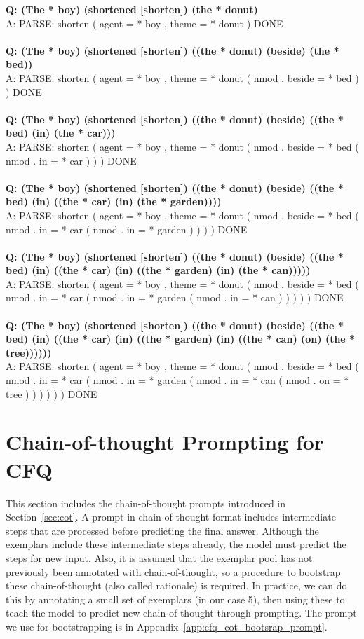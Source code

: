 \documentclass{article} \usepackage{iclr2022_conference,times}
\newcommand{\prompt}[1]{{\footnotesize \textsf{#1}}}
\begin{document}
\prompt{\textbf{Q: (The * boy) (shortened [shorten]) (the * donut)} \\
A: PARSE: shorten ( agent = * boy , theme = * donut ) DONE \\
\\
\textbf{Q: (The * boy) (shortened [shorten]) ((the * donut) (beside) (the * bed))} \\
A: PARSE: shorten ( agent = * boy , theme = * donut ( nmod . beside = * bed ) ) DONE \\
\\
\textbf{Q: (The * boy) (shortened [shorten]) ((the * donut) (beside) ((the * bed) (in) (the * car)))} \\
A: PARSE: shorten ( agent = * boy , theme = * donut ( nmod . beside = * bed ( nmod . in = * car ) ) ) DONE \\
\\
\textbf{Q: (The * boy) (shortened [shorten]) ((the * donut) (beside) ((the * bed) (in) ((the * car) (in) (the * garden))))} \\
A: PARSE: shorten ( agent = * boy , theme = * donut ( nmod . beside = * bed ( nmod . in = * car ( nmod . in = * garden ) ) ) ) DONE \\
\\
\textbf{Q: (The * boy) (shortened [shorten]) ((the * donut) (beside) ((the * bed) (in) ((the * car) (in) ((the * garden) (in) (the * can)))))} \\
A: PARSE: shorten ( agent = * boy , theme = * donut ( nmod . beside = * bed ( nmod . in = * car ( nmod . in = * garden ( nmod . in = * can ) ) ) ) ) DONE \\
\\
\textbf{Q: (The * boy) (shortened [shorten]) ((the * donut) (beside) ((the * bed) (in) ((the * car) (in) ((the * garden) (in) ((the * can) (on) (the * tree))))))} \\
A: PARSE: shorten ( agent = * boy , theme = * donut ( nmod . beside = * bed ( nmod . in = * car ( nmod . in = * garden ( nmod . in = * can ( nmod . on = * tree ) ) ) ) ) ) DONE
}


\section{Chain-of-thought Prompting for CFQ}

This section includes the chain-of-thought prompts introduced in Section~\ref{sec:cot}. A prompt in chain-of-thought format includes intermediate steps that are processed before predicting the final answer. Although the exemplars include these intermediate steps already, the model must predict the steps for new input. Also, it is assumed that the exemplar pool has not previously been annotated with chain-of-thought, so a procedure to bootstrap these chain-of-thought (also called rationale) is required. In practice, we can do this by annotating a small set of exemplars (in our case 5), then using these to teach the model to predict new chain-of-thought through prompting. The prompt we use for bootstrapping is in Appendix~\ref{app:cfq_cot_bootsrap_prompt}.
\end{document}
